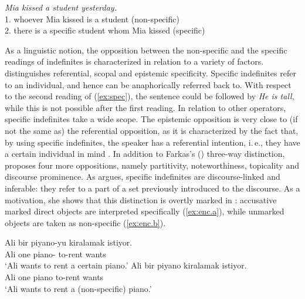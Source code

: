 \documentclass[output=paper]{langsci/langscibook}
\begin{document}
\begin{exe}
\ex\label{ex:spec}
{\emph{Mia kissed a student yesterday.}} \\
1. whoever Mia kissed is a student (non-specific) \\
2. there is a specific student whom Mia kissed (specific)
\end{exe}

As a linguistic notion, the opposition between the non-specific and the specific readings of indefinites is characterized in relation to a variety of factors. \citet{farkas:94} distinguishes referential, scopal and epistemic specificity. Specific indefinites refer to an individual, and hence can be anaphorically referred back to. With respect to the second reading of (\ref{ex:spec}), the sentence could be followed by {\emph{He is tall}}, while this is not possible after the first reading. In relation to other operators, specific indefinites take a wide scope. The epistemic opposition is very close to (if not the same as) the referential opposition, as it is characterized by the fact that, by using specific indefinites, the speaker has a referential intention, i.\,e., they have a certain individual in mind \citep{karttunen:68,farkas:94}. In addition to Farkas's  (\citeyear{farkas:94}) three-way distinction, \citet{vonheus:11,vonheus:19} proposes four more oppositions, namely partitivity, noteworthiness, topicality and discourse prominence. As \citet{enc:91} argues, specific indefinites are discourse-linked and inferable: they refer to a part of a set previously introduced to the discourse. As a motivation, she shows that this distinction is overtly marked in : accusative marked direct objects are interpreted specifically (\ref{ex:enc.a}), while unmarked objects are taken as non-specific (\ref{ex:enc.b}).

\begin{exe}
\ex
	\begin{xlista}
	\ex\label{ex:enc.a}
	\gll Ali bir piyano-yu kiralamak istiyor.\\
	Ali one piano-{} to-rent wants\\
	\glt `Ali wants to rent a certain piano.' \hfill \citep[][ex.12]{enc:91}
	\ex\label{ex:enc.b}
	\gll Ali bir piyano kiralamak istiyor.\\
	Ali one piano to-rent wants\\
	\glt `Ali wants to rent a (non-specific) piano.' \hfill \citep[][ex.13]{enc:91}
	\end{xlista}
\end{exe}
\end{document}
